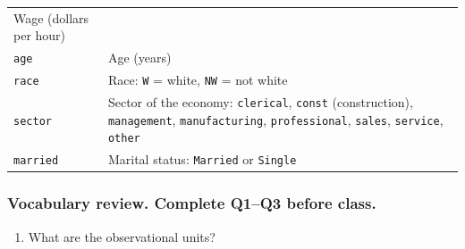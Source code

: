 \documentclass[
]{report}
\providecommand{\tightlist}{%
  \setlength{\itemsep}{0pt}\setlength{\parskip}{0pt}}
\begin{document}
\begin{longtable}[]{@{}ll@{}}
\begin{minipage}[t]{0.83\columnwidth}
Wage (dollars per hour)\strut
\end{minipage}\tabularnewline
\begin{minipage}[t]{0.11\columnwidth}\raggedright
\texttt{age}\strut
\end{minipage} & \begin{minipage}[t]{0.83\columnwidth}\raggedright
Age (years)\strut
\end{minipage}\tabularnewline
\begin{minipage}[t]{0.11\columnwidth}\raggedright
\texttt{race}\strut
\end{minipage} & \begin{minipage}[t]{0.83\columnwidth}\raggedright
Race: \texttt{W} = white, \texttt{NW} = not white\strut
\end{minipage}\tabularnewline
\begin{minipage}[t]{0.11\columnwidth}\raggedright
\texttt{sector}\strut
\end{minipage} & \begin{minipage}[t]{0.83\columnwidth}\raggedright
Sector of the economy: \texttt{clerical}, \texttt{const} (construction), \texttt{management}, \texttt{manufacturing}, \texttt{professional}, \texttt{sales}, \texttt{service}, \texttt{other}\strut
\end{minipage}\tabularnewline
\begin{minipage}[t]{0.11\columnwidth}\raggedright
\texttt{married}\strut
\end{minipage} & \begin{minipage}[t]{0.83\columnwidth}\raggedright
Marital status: \texttt{Married} or \texttt{Single}\strut
\end{minipage}\tabularnewline
\bottomrule
\end{longtable}

\hypertarget{vocabulary-review.-complete-q1q3-before-class.}{%
\subsubsection*{Vocabulary review. Complete Q1--Q3 before class.}\label{vocabulary-review.-complete-q1q3-before-class.}}

\begin{enumerate}
\def\labelenumi{\arabic{enumi}.}
\tightlist
\item
  What are the observational units?
\end{enumerate}
\end{document}
